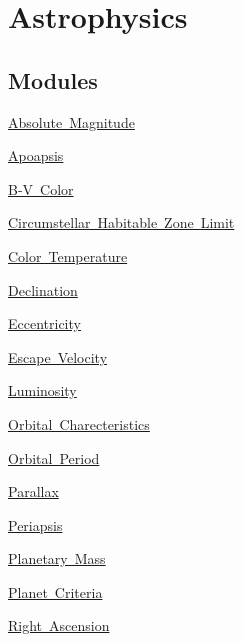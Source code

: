 \hypertarget{group___e_g_x_phys-_astrophysics}{}\section{Astrophysics}
\label{group___e_g_x_phys-_astrophysics}
\subsection*{Modules}
\begin{DoxyCompactItemize}
\item 
\mbox{\hyperlink{group___e_g_x_phys-_astrophysics-_absolute_magnitude}{Absolute Magnitude}}
\item 
\mbox{\hyperlink{group___e_g_x_phys-_apoapsis}{Apoapsis}}
\item 
\mbox{\hyperlink{group___e_g_x_phys-_astrophysic-_b-_v_color}{B-\/\+V Color}}
\item 
\mbox{\hyperlink{group___e_g_x_phys-_circumstellar_habitable_zone_limit}{Circumstellar Habitable Zone Limit}}
\item 
\mbox{\hyperlink{group___e_g_x_phys-_astrophysics-_color_temperature}{Color Temperature}}
\item 
\mbox{\hyperlink{group___e_g_x_phys-_astrophysics-_declination}{Declination}}
\item 
\mbox{\hyperlink{group___e_g_x_phys-_eccentricity}{Eccentricity}}
\item 
\mbox{\hyperlink{group___e_g_x_phys-_astrophysics-_escape_velocity}{Escape Velocity}}
\item 
\mbox{\hyperlink{group___e_g_x_phys-_luminosity}{Luminosity}}
\item 
\mbox{\hyperlink{group___e_g_x_phys-_orbital_charecteristics}{Orbital Charecteristics}}
\item 
\mbox{\hyperlink{group___e_g_x_phys-_astrophysic-_orbital_period}{Orbital Period}}
\item 
\mbox{\hyperlink{group___e_g_x_phys-_astrophysic-_parallax}{Parallax}}
\item 
\mbox{\hyperlink{group___e_g_x_phys-_periapsis}{Periapsis}}
\item 
\mbox{\hyperlink{group___e_g_x_phys-_planetary_mass}{Planetary Mass}}
\item 
\mbox{\hyperlink{group___e_g_x_phys-_planet_criteria}{Planet Criteria}}
\item 
\mbox{\hyperlink{group___e_g_x_phys-_astrophysics-_right_ascension}{Right Ascension}}
\item 

\end{DoxyCompactItemize}
